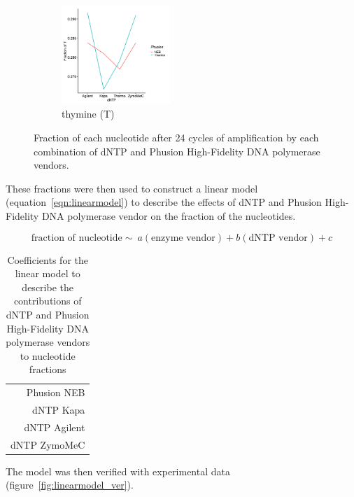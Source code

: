 \documentclass[parskip=full, numbers=noenddot]{scrreprt}
\begin{document}
\begin{figure}[h]
  \begin{subfigure}[h]{0.45\textwidth}
    \centering
    \includegraphics[width=0.45\textwidth]{linearmodel_t}
    \caption{thymine (T)}
    \label{fig:linearmodel_t}
  \end{subfigure}
  \caption{Fraction of each nucleotide after 24 cycles of amplification by each combination of dNTP and Phusion High-Fidelity DNA polymerase vendors.}
  \label{fig:linearmodel_nt}
\end{figure}

These fractions were then used to construct a linear model (equation~\ref{eqn:linearmodel}) to describe the effects of dNTP and Phusion High-Fidelity DNA polymerase vendor on the fraction of the nucleotides.

\begin{equation}
  \label{eqn:linearmodel}
  \textrm{fraction of nucleotide} \sim\ a (\textrm{enzyme vendor}) + b (\textrm{dNTP vendor}) + c
\end{equation}

\begin{table}[h]
  \centering
  \begin{tabular}{r}
     \\
    Phusion NEB\\
    dNTP Kapa\\
    dNTP Agilent\\
    dNTP ZymoMeC\\
  \end{tabular}%
  \caption{Coefficients for the linear model to describe the contributions of dNTP and Phusion High-Fidelity DNA polymerase vendors to nucleotide fractions}
  \label{tab:linearmodel_coeffs}
\end{table}

The model was then verified with experimental data (figure~\ref{fig:linearmodel_ver}).
\end{document}
